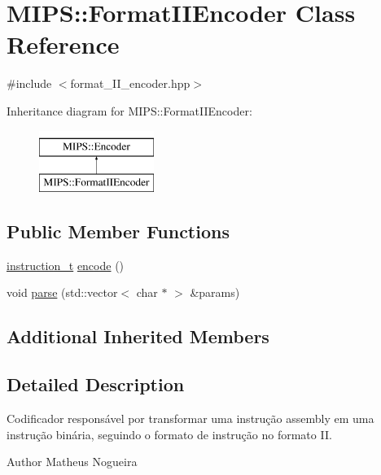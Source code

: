 \hypertarget{classMIPS_1_1FormatIIEncoder}{}\section{M\+I\+PS\+:\+:Format\+I\+I\+Encoder Class Reference}
\label{classMIPS_1_1FormatIIEncoder}


{\ttfamily \#include $<$format\+\_\+\+I\+I\+\_\+encoder.\+hpp$>$}

Inheritance diagram for M\+I\+PS\+:\+:Format\+I\+I\+Encoder\+:\begin{figure}[H]
\begin{center}
\leavevmode
\includegraphics[height=2.000000cm]{classMIPS_1_1FormatIIEncoder}
\end{center}
\end{figure}
\subsection*{Public Member Functions}
\begin{DoxyCompactItemize}
\item 
\hyperlink{core_8hpp_aa514fd240a0e29abb2a2e4c805d7f1a4}{instruction\+\_\+t} \hyperlink{classMIPS_1_1FormatIIEncoder_aaf5f5f9d4c9b6b63b150b239cb5b03fe}{encode} ()
\item 
void \hyperlink{classMIPS_1_1FormatIIEncoder_aa988c9638985b07eea58f3e11ff4c2e7}{parse} (std\+::vector$<$ char $\ast$ $>$ \&params)
\end{DoxyCompactItemize}
\subsection*{Additional Inherited Members}


\subsection{Detailed Description}
Codificador responsável por transformar uma instrução assembly em uma instrução binária, seguindo o formato de instrução no formato II.

\begin{DoxyAuthor}{Author}
Matheus Nogueira 
\end{DoxyAuthor}


